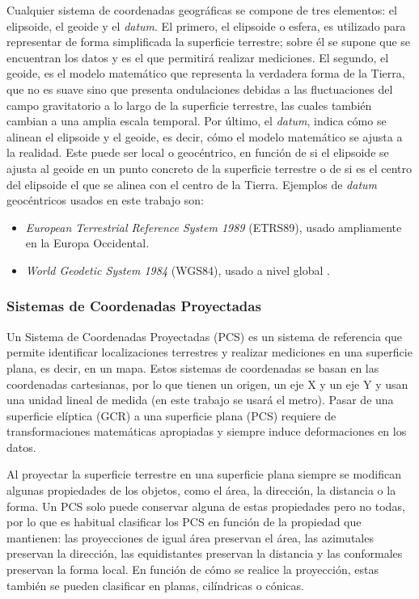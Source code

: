 \documentclass[12pt,a4paper,]{book}
\providecommand{\tightlist}{%
  \setlength{\itemsep}{0pt}\setlength{\parskip}{0pt}}
\numberwithin{dummy}{section}
\theoremstyle{ocrenumbox}
\theoremstyle{blacknumex}
\theoremstyle{blacknumbox}
\theoremstyle{ocrenum}
\theoremstyle{ocrenum}
\begin{document}
Cualquier sistema de coordenadas geográficas se compone de tres
elementos: el elipsoide, el geoide y el \emph{datum}. El primero, el
elipsoide o esfera, es utilizado para representar de forma simplificada
la superficie terrestre; sobre él se supone que se encuentran los datos
y es el que permitirá realizar mediciones. El segundo, el geoide, es el
modelo matemático que representa la verdadera forma de la Tierra, que no
es suave sino que presenta ondulaciones debidas a las fluctuaciones del
campo gravitatorio a lo largo de la superficie terrestre, las cuales
también cambian a una amplia escala temporal. Por último, el
\emph{datum}, indica cómo se alinean el elipsoide y el geoide, es decir,
cómo el modelo matemático se ajusta a la realidad. Este puede ser local
o geocéntrico, en función de si el elipsoide se ajusta al geoide en un
punto concreto de la superficie terrestre o de si es el centro del
elipsoide el que se alinea con el centro de la Tierra. Ejemplos de
\emph{datum} geocéntricos usados en este trabajo son:

\begin{itemize}
\tightlist
\item
  \emph{European Terrestrial Reference System 1989} (ETRS89), usado
  ampliamente en la Europa Occidental.
\item
  \emph{World Geodetic System 1984} (WGS84), usado a nivel global
  \citep{lovelace_geocomputation_2019}.
\end{itemize}

\hypertarget{sistemas-de-coordenadas-proyectadas}{%
\subsubsection*{Sistemas de Coordenadas
Proyectadas}\label{sistemas-de-coordenadas-proyectadas}}

Un Sistema de Coordenadas Proyectadas (PCS) es un sistema de referencia
que permite identificar localizaciones terrestres y realizar mediciones
en una superficie plana, es decir, en un mapa. Estos sistemas de
coordenadas se basan en las coordenadas cartesianas, por lo que tienen
un origen, un eje X y un eje Y y usan una unidad lineal de medida (en
este trabajo se usará el metro). Pasar de una superficie elíptica (GCR)
a una superficie plana (PCS) requiere de transformaciones matemáticas
apropiadas y siempre induce deformaciones en los datos.

Al proyectar la superficie terrestre en una superficie plana siempre se
modifican algunas propiedades de los objetos, como el área, la
dirección, la distancia o la forma. Un PCS solo puede conservar alguna
de estas propiedades pero no todas, por lo que es habitual clasificar
los PCS en función de la propiedad que mantienen: las proyecciones de
igual área preservan el área, las azimutales preservan la dirección, las
equidistantes preservan la distancia y las conformales preservan la
forma local. En función de cómo se realice la proyección, estas también
se pueden clasificar en planas, cilíndricas o cónicas.
\end{document}
